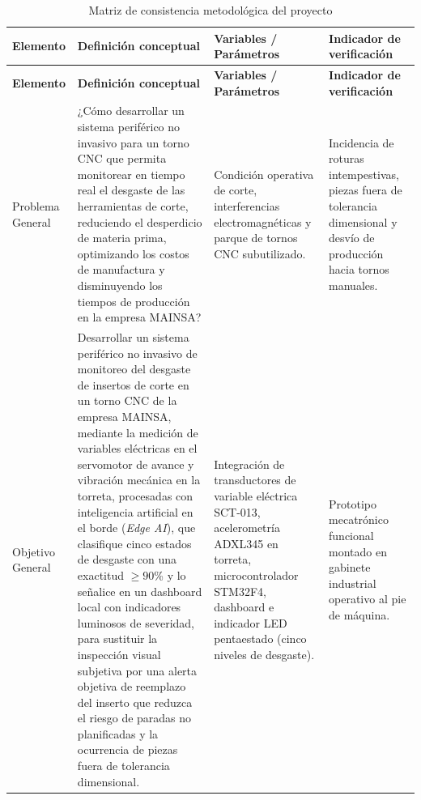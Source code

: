 {\footnotesize
{}
\setlength{\parskip}{1.5pt}
\setlength{\tabcolsep}{3.5pt}
\begin{longtable}{|>{\raggedright\arraybackslash}p{2.1cm}|>{\raggedright\arraybackslash}p{3.8cm}|>{\raggedright\arraybackslash}p{3.8cm}|>{\raggedright\arraybackslash}p{3.8cm}|}
\caption{Matriz de consistencia metodológica del proyecto}
\label{tab:matriz_consistencia}
\\
\hline
\textbf{Elemento} & \textbf{Definición conceptual} & \textbf{Variables / Parámetros} & \textbf{Indicador de verificación} \\
\hline \hline
\endfirsthead

\hline
\textbf{Elemento} & \textbf{Definición conceptual} & \textbf{Variables / Parámetros} & \textbf{Indicador de verificación} \\
\hline \hline
\endhead

\hline
\endfoot

\hline
\multicolumn{4}{c}{\textbf{Fuente:} Elaboración propia, 2026.}
\endlastfoot

Problema General & 
¿Cómo desarrollar un sistema periférico no invasivo para un torno CNC que permita monitorear en tiempo real el desgaste de las herramientas de corte, reduciendo el desperdicio de materia prima, optimizando los costos de manufactura y disminuyendo los tiempos de producción en la empresa MAINSA? & 
Condición operativa de corte, interferencias electromagnéticas y parque de tornos CNC subutilizado. & 
Incidencia de roturas intempestivas, piezas fuera de tolerancia dimensional y desvío de producción hacia tornos manuales.\\ \hline

Objetivo General & 
Desarrollar un sistema periférico no invasivo de monitoreo del desgaste de insertos de corte en un torno CNC de la empresa MAINSA, mediante la medición de variables eléctricas en el servomotor de avance y vibración mecánica en la torreta, procesadas con inteligencia artificial en el borde (\textit{Edge AI}), que clasifique cinco estados de desgaste con una exactitud $\ge 90$\% y lo señalice en un dashboard local con indicadores luminosos de severidad, para sustituir la inspección visual subjetiva por una alerta objetiva de reemplazo del inserto que reduzca el riesgo de paradas no planificadas y la ocurrencia de piezas fuera de tolerancia dimensional. & 
Integración de transductores de variable eléctrica SCT-013, acelerometría ADXL345 en torreta, microcontrolador STM32F4, dashboard e indicador LED pentaestado (cinco niveles de desgaste). & 
Prototipo mecatrónico funcional montado en gabinete industrial operativo al pie de máquina.\\ \hline


\end{longtable}}
